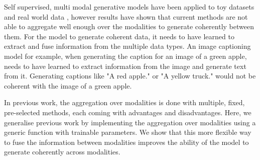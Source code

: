 Self supervised, multi modal generative models have been applied to toy datasets \citep{shi_variational_2019, sutter_generalized_2020, poe} and real world data \citep{klug_multimodal_nodate}, however results have shown that current methods are not able to aggregate well enough over the modalities to generate coherently between them.
For the model to generate coherent data, it needs to have learned to extract and fuse information from the multiple data types.
An image captioning model for example, when generating the caption for an image of a green apple, needs to have learned to extract information from the image and generate text from it.
Generating captions like "A red apple." or "A yellow truck." would not be coherent with the image of a green apple.

\smallskip

In previous work, the aggregation over modalities is done with multiple, fixed, pre-selected methods, each coming with advantages and disadvantages.
Here, we generalise previous work by implementing the aggregation over modalities using a generic function with trainable parameters.
We show that this more flexible way to fuse the information between modalities improves the ability of the model to generate coherently across modalities.